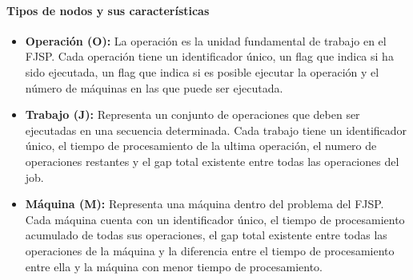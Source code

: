 \paragraph{Tipos de nodos y sus características}
\begin{itemize}
    \item \textbf{Operación (O):} La operación es la unidad fundamental de trabajo en el FJSP. Cada 
    operación tiene un identificador único, un flag que indica si ha sido ejecutada,
    un flag que indica si es posible ejecutar la operación y el número de máquinas en las que puede
    ser ejecutada.
    \item \textbf{Trabajo (J):} Representa un conjunto de operaciones que deben ser ejecutadas 
    en una secuencia determinada. Cada trabajo tiene un identificador único, el tiempo de 
    procesamiento de la ultima operación, el numero de operaciones restantes y el gap total
    existente entre todas las operaciones del job.
    \item \textbf{Máquina (M):} Representa una máquina dentro del problema del FJSP. Cada máquina 
    cuenta con un identificador único, el tiempo de procesamiento acumulado de todas sus operaciones,
    el gap total existente entre todas las operaciones de la máquina y la diferencia entre el tiempo
    de procesamiento entre ella y la máquina con menor tiempo de procesamiento.  
\end{itemize}

